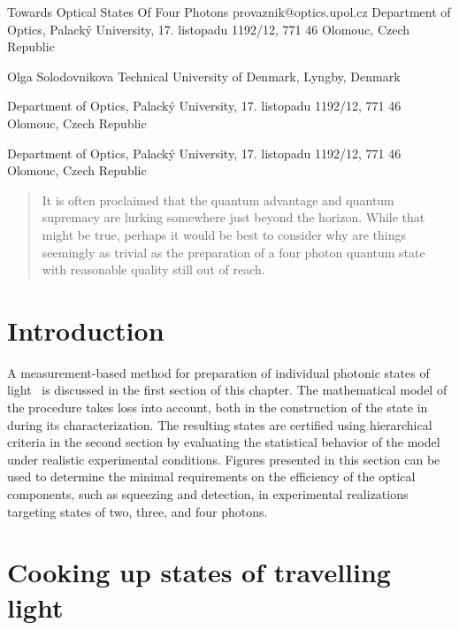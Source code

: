 \documentclass{article}
\begin{document}
\ArticleTitle
  {Towards Optical States Of Four Photons}
  {provaznik@optics.upol.cz}
\ArticleAuthorAddress
  {Department of Optics, Palack\'{y} University, 17. listopadu 1192/12, 771 46 Olomouc, Czech Republic}

\ArticleAuthor
  {Olga Solodovnikova}
\ArticleAuthorAddress
  {Technical University of Denmark, Lyngby, Denmark}

\ArticleAuthorAddress
  {Department of Optics, Palack\'{y} University, 17. listopadu 1192/12, 771 46 Olomouc, Czech Republic}

\ArticleAuthorAddress
  {Department of Optics, Palack\'{y} University, 17. listopadu 1192/12, 771 46 Olomouc, Czech Republic}

\ArticleTitlePrint

\begin{abstract}\noindent
  It is often proclaimed that the quantum advantage and quantum supremacy are lurking somewhere just beyond the horizon. While that might be true, perhaps it would be best to consider why are things seemingly as trivial as the preparation of a four photon quantum state with reasonable quality still out of reach.
\end{abstract}

%
%

\section{Introduction}

A measurement-based method for preparation of individual photonic states of light~\cite{yukawa2013a,yoshikawa2018,tiedau2019,provaznik2020} is discussed in the first section of this chapter. The mathematical model of the procedure takes loss into account, both in the construction of the state in during its characterization. The resulting states are certified using hierarchical criteria \cite{lachman2019} in the second section by evaluating the statistical behavior of the model under realistic experimental conditions. Figures presented in this section can be used to determine the minimal requirements on the efficiency of the optical components, such as squeezing and detection, in experimental realizations targeting states of two, three, and four photons.

%
%

\section{Cooking up states of travelling light}
\end{document}
